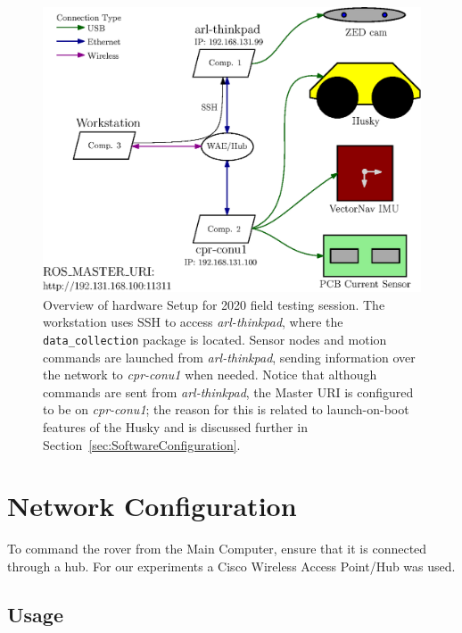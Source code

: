 \documentclass[
	12pt, %
]{fphw}
\newcommand{\code}[1]{\colorbox{light-gray}{\texttt{#1}}}
\begin{document}
\begin{figure}
	\centering
	\includegraphics[scale=1]{figs/SetupOverview.eps}
	\caption{Overview of hardware Setup for 2020 field testing session. The workstation uses SSH to access \emph{arl-thinkpad}, where the \code{data\_collection} package is located. Sensor nodes and motion commands are launched from \emph{arl-thinkpad}, sending information over the network to \emph{cpr-conu1} when needed. Notice that although commands are sent from \emph{arl-thinkpad}, the Master URI is configured to be on \emph{cpr-conu1}; the reason for this is related to launch-on-boot features of the Husky and is discussed further in Section~\ref{sec:SoftwareConfiguration}.}
	\label{fig:SetupOverview}
\end{figure}


\section{Network Configuration}
\label{sec:NetworkConfiguration}


To command the rover from the Main Computer, ensure that it is connected through a hub. For our experiments a Cisco Wireless Access Point/Hub was used.

\subsection{Usage}
\label{subsec:NetworkConfigurationUsage}
\end{document}
